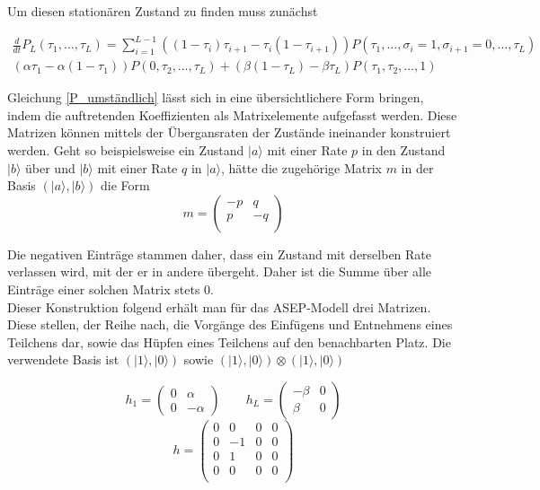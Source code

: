 \documentclass[10pt,a4paper]{report}
\begin{document}
Um diesen stationären Zustand zu finden muss zunächst 

\begin{equation}\label{P_umständlich}
\begin{split}
\frac{d}{dt}P_L(\tau_1,\ldots,\tau_L) = \sum_{i=1}^{L-1}((1-\tau_i)\tau_{i+1}-\tau_i(1-\tau_{i+1}) )P(\tau_1,\ldots,\sigma_i=1,\sigma_{i+1}=0,\ldots,\tau_L)\\
(\alpha\tau_1-\alpha(1-\tau_1)) P(0,\tau_2,\ldots,\tau_L)+(\beta(1-\tau_L)-\beta\tau_L) P(\tau_1,\tau_2,\ldots,1)
\end{split}
\end{equation}

Gleichung \ref{P_umständlich} lässt sich in eine übersichtlichere Form bringen, indem die auftretenden Koeffizienten als Matrixelemente aufgefasst werden. Diese Matrizen können mittels der Übergansraten der Zustände ineinander konstruiert werden. Geht so beispielsweise ein Zustand $|a\rangle$ mit einer Rate $p$ in den Zustand $|b\rangle$ über und $|b\rangle$ mit einer Rate $q$ in $|a\rangle$, hätte die zugehörige Matrix $m$ in der Basis $(|a\rangle,|b\rangle)$ die Form
\begin{equation}
m=
\begin{pmatrix}
-p&q\\
p&-q\\
\end{pmatrix}
\end{equation}

Die negativen Einträge stammen daher, dass ein Zustand mit derselben Rate verlassen wird, mit der er in andere übergeht. Daher ist die Summe über alle Einträge einer solchen Matrix stets 0.\\

Dieser Konstruktion folgend erhält man für das ASEP-Modell drei Matrizen. Diese stellen, der Reihe nach, die Vorgänge des Einfügens und Entnehmens eines Teilchens dar, sowie das Hüpfen eines Teilchens auf den benachbarten Platz. Die verwendete Basis ist $(|1\rangle,|0\rangle)$ sowie $(|1\rangle,|0\rangle)\otimes(|1\rangle,|0\rangle)$

\begin{equation}
h_1=
\begin{pmatrix}
0&\alpha\\ 0&-\alpha
\end{pmatrix}
\qquad
h_L=
\begin{pmatrix}
-\beta&0\\ \beta&0
\end{pmatrix}
\end{equation}
\vspace{1px}
\begin{equation*}
h=
\begin{pmatrix}
0&0&0&0\\
0&-1&0&0\\
0&1&0&0\\
0&0&0&0\\
\end{pmatrix}
\end{equation*}
\end{document}
